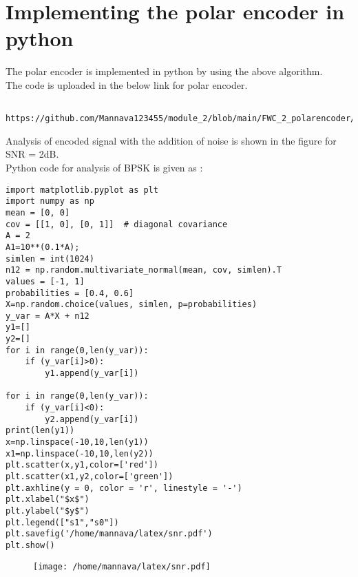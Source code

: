 \documentclass[journal,5pt,twocolumn]{IEEEtran}
\begin{document}
 \section{\textbf{Implementing the polar encoder in python}}
 The polar encoder is implemented in python by using the above algorithm. \\
 The code is uploaded in the below link for polar encoder.\\
 \begin{lstlisting}
 https://github.com/Mannava123455/module_2/blob/main/FWC_2_polarencoder/codes/polar_python/polarencoder.py
 \end{lstlisting}
Analysis of encoded signal with the addition of noise is shown in the figure for SNR = 2dB. \\
Python code for analysis of BPSK is given as :\\
\begin{lstlisting}
import matplotlib.pyplot as plt
import numpy as np
mean = [0, 0]
cov = [[1, 0], [0, 1]]  # diagonal covariance
A = 2
A1=10**(0.1*A);
simlen = int(1024)
n12 = np.random.multivariate_normal(mean, cov, simlen).T
values = [-1, 1]
probabilities = [0.4, 0.6]
X=np.random.choice(values, simlen, p=probabilities)
y_var = A*X + n12
y1=[]
y2=[]
for i in range(0,len(y_var)):
    if (y_var[i]>0):
        y1.append(y_var[i])

for i in range(0,len(y_var)):
    if (y_var[i]<0):
        y2.append(y_var[i])
print(len(y1))
x=np.linspace(-10,10,len(y1))
x1=np.linspace(-10,10,len(y2))
plt.scatter(x,y1,color=['red'])
plt.scatter(x1,y2,color=['green'])
plt.axhline(y = 0, color = 'r', linestyle = '-')
plt.xlabel("$x$")
plt.ylabel("$y$")
plt.legend(["s1","s0"])
plt.savefig('/home/mannava/latex/snr.pdf')
plt.show()
\end{lstlisting}
\begin{figure}[!ht]
\begin{center}
\texttt{[image: /home/mannava/latex/snr.pdf]}
\end{center}
\label{fig : check}
\end{figure}
\end{document}
